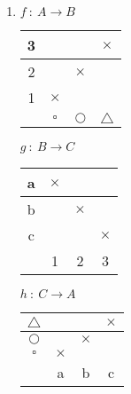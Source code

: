 \documentclass{article}
\begin{document}
\begin{enumerate}[label=\alph*)]
    \item
    \begin{minipage}{0.3\textwidth}
        \begin{center}
            $f\ :\ A \rightarrow B$
            \vspace{0.1cm}

            \begin{tabular}{c | c | c | c}
                3 &  &  & $\times$ \\\hline
                2 &  & $\times$ &  \\\hline
                1 & $\times$ & &  \\\hline
                  & $\square$ & $\bigcirc$ & $\triangle$
            \end{tabular}
        \end{center}
    \end{minipage}
    \hfill
    \begin{minipage}{0.3\textwidth}
        \begin{center}
            $g\ :\ B \rightarrow C$
            \vspace{0.1cm}

            \begin{tabular}{c | c | c | c}
                a & $\times$ &   &   \\\hline
                b &   & $\times$ &   \\\hline
                c &   &   & $\times$ \\\hline
                  & 1 & 2 & 3 \\
            \end{tabular}
        \end{center}
    \end{minipage}
    \hfill
    \begin{minipage}{0.3\textwidth}
        \begin{center}
            $h\ :\ C \rightarrow A$
            \vspace{0.1cm}

            \begin{tabular}{c | c | c | c}
                $\triangle$ &   &   & $\times$ \\\hline
                $\bigcirc$ &   & $\times$ &   \\\hline
                $\square$ & $\times$ &   &   \\\hline
                  & a & b & c
            \end{tabular}
        \end{center}
    \end{minipage}
    

\end{enumerate}
\end{document}
